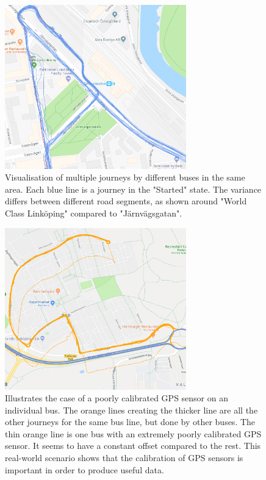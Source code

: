\begin{figure}[ht!]
    \centering
    \includegraphics[width=0.7\textwidth]{figures/gps_variation}
    \caption[Visualisation of multiple journeys by different buses in the same area]
    {\small Visualisation of multiple journeys by different buses in the same area.
    Each blue line is a journey in the "Started" state.
    The variance differs between different road segments, as shown around "World Class Linköping" compared to "Järnvägsgatan".}
    \label{fig:gps-variation}
\end{figure}

\begin{figure}[ht!]
    \centering
    \includegraphics[width=0.7\textwidth]{figures/gps_sensor_calibration}
    \caption[Illustrates the case of a poorly calibrated GPS sensor on an individual bus]
    {\small Illustrates the case of a poorly calibrated GPS sensor on an individual bus.
    The orange lines creating the thicker line are all the other journeys for the same bus line, but done by other buses.
    The thin orange line is one bus with an extremely poorly calibrated GPS sensor.
    It seems to have a constant offset compared to the rest.
    This real-world scenario shows that the calibration of GPS sensors is important in order to produce useful data.}
    \label{fig:gps-sensor-calibration}
\end{figure}


